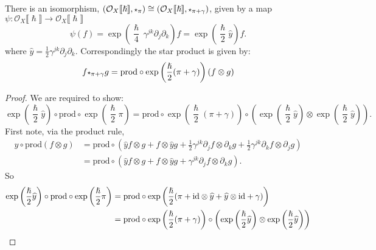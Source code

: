     \begin{lem}
    There is an isomorphism, \( (\mathcal{O}_X \lBrack \hslash \rBrack,
    \starp_{\pi} ) \cong ( \mathcal{O}_X \lBrack \hslash \rBrack, \starp_{\pi + \gamma} )\), given by a map 
    \(\psi : \mathcal{O}_X \lBrack \hslash \rBrack \rightarrow \mathcal{O}_X \lBrack \hslash \rBrack\)  
    \begin{equation} 
    \label{eqn:star_prod_iso}
    \psi(f) = \exp \left( \frac{\hslash}{4} \, \gamma^{jk} \partial_j \partial_k \right) f = \exp \left( \frac{\hslash}{2} \widehat{y} \right) f.
    \end{equation}
    where \( \widehat{y} = \frac{1}{2} \gamma^{jk} \partial_j \partial_k\).
    Correspondingly the star product is given by: 
    \[f \starp_{\pi + \gamma}g =  \mathrm{prod} \circ \exp  \left( \frac{\hslash}{2} ( \pi + \gamma ) \right) (f \otimes g) \]
    \end{lem}
    
    \begin{proof}
    We are required to show:
    \[ \exp \left( \frac{\hslash}{2} \widehat{y} \right) \circ  \mathrm{prod} \circ \exp  \left( \frac{\hslash}{2}  \pi   \right) = \mathrm{prod} \circ \exp  \left( \frac{\hslash}{2}  (\pi + \gamma ) \right) \circ \left( \exp \left( \frac{\hslash}{2} \widehat{y} \right) \otimes \exp \left( \frac{\hslash}{2} \widehat{y} \right) \right).  \]
    First note, via the product rule, 
    \begin{align*} \widehat{y} \circ \mathrm{prod} ( f \otimes g) &= \mathrm{prod} \circ  ( \widehat{y} f \otimes g + f \otimes \widehat{y} g + \frac{1}{2} \gamma^{jk} \partial_j f \otimes \partial_k g + \frac{1}{2} \gamma^{jk}  \partial_k f \otimes \partial_j g) \\ 
    &= \mathrm{prod} \circ  ( \widehat{y} f \otimes g + f \otimes \widehat{y} g + \gamma^{jk} \partial_j f \otimes \partial_k g ). 
    \end{align*}
    So 
    \begin{align*} \exp \left( \frac{\hslash}{2} \widehat{y} \right) \circ \mathrm{prod} \circ \exp \left( \frac{\hslash}{2} \pi  \right)  &= \mathrm{prod} \circ  \exp \left( \frac{\hslash}{2} ( \pi +  \mathrm{id} \otimes \widehat{y} + \widehat{y} \otimes \mathrm{id} +  \gamma ) \right) \\
    &= \mathrm{prod} \circ \exp  \left( \frac{\hslash}{2}  (\pi + \gamma ) \right) \circ \left( \exp \left( \frac{\hslash}{2} \widehat{y} \right) \otimes \exp \left( \frac{\hslash}{2} \widehat{y} \right) \right) 
    \end{align*}
    \end{proof}
    
